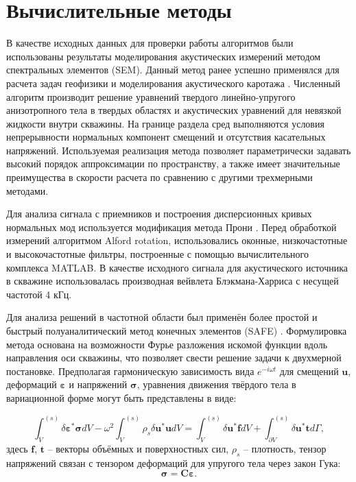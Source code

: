 \documentclass[a4paper,11pt]{article}
\begin{document}
\section{Вычислительные методы}

В качестве исходных данных для проверки работы алгоритмов были использованы результаты моделирования акустических измерений методом спектральных элементов (SEM). Данный метод ранее успешно применялся для расчета задач геофизики \cite{Komatitsch1999} и моделирования акустического каротажа \cite{Charara2011}. Численный алгоритм производит решение уравнений твердого линейно-упругого анизотропного тела в твердых областях и акустических уравнений для невязкой жидкости внутри скважины. На границе раздела сред выполняются условия непрерывности нормальных компонент смещений и отсутствия касательных напряжений. Используемая реализация метода позволяет параметрически задавать высокий порядок аппроксимации по пространству, а также имеет значительные преимущества в скорости расчета по сравнению с другими трехмерными методами.

Для анализа сигнала с приемников и построения дисперсионных кривых нормальных мод используется модификация метода Прони \cite{Ekstrom1995}. Перед обработкой измерений алгоритмом Alford rotation, использовались оконные, низкочастотные и высокочастотные фильтры, построенные с помощью вычислительного комплекса MATLAB. В качестве исходного сигнала для акустического источника в скважине использовалась производная вейвлета Блэкмана-Харриса с несущей частотой 4 кГц. 

Для анализа решений в частотной области был применён более простой и быстрый полуаналитический метод конечных элементов (SAFE) \cite{Bartoli2006}. Формулировка метода основана на возможности Фурье разложения искомой функции вдоль направления оси скважины, что позволяет свести решение задачи к двухмерной постановке. Предполагая гармоническую зависимость вида $e^{-i\omega t}$ для смещений $\mathbf{u}$, деформаций $\boldsymbol{\varepsilon}$ и напряжений $\boldsymbol{\sigma}$, уравнения движения твёрдого тела в вариационной форме могут быть представлены в виде:

\begin{equation}
\int_{V}^{(s)}\delta \boldsymbol{\varepsilon}^* \boldsymbol{\sigma} dV - \omega^2 \int_{V}^{(s)} \rho_s \delta \mathbf{u}^*\mathbf{u}dV = \int_{V}^{(s)}\delta \mathbf{u}^* \mathbf{f} dV + \int_{\partial V}^{(s)}\delta \mathbf{u}^* \mathbf{t} d\Gamma, \label{var_eq_solid}
\end{equation}
здесь $\mathbf{f}$, $\mathbf{t}$ -- векторы объёмных и поверхностных сил, $\rho_s$ -- плотность, тензор напряжений связан с тензором деформаций для упругого тела через закон Гука:
$$
\boldsymbol{\sigma} = \mathbf{C}\boldsymbol{\varepsilon}.
$$
\end{document}

